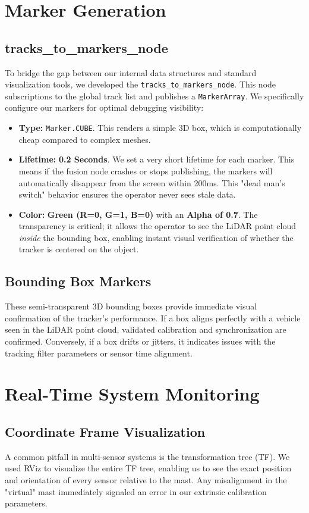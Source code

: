 \documentclass[12pt,a4paper]{report}
\begin{document}
{\section{Marker Generation}

\subsection{tracks\_to\_markers\_node}
To bridge the gap between our internal data structures and standard visualization tools, we developed the \texttt{tracks\_to\_markers\_node}. This node subscriptions to the global track list and publishes a \texttt{MarkerArray}. We specifically configure our markers for optimal debugging visibility:
\begin{itemize}
    \item \textbf{Type:} \texttt{Marker.CUBE}. This renders a simple 3D box, which is computationally cheap compared to complex meshes.
    \item \textbf{Lifetime:} \textbf{0.2 Seconds}. We set a very short lifetime for each marker. This means if the fusion node crashes or stops publishing, the markers will automatically disappear from the screen within 200ms. This "dead man's switch" behavior ensures the operator never sees stale data.
    \item \textbf{Color:} \textbf{Green (R=0, G=1, B=0)} with an \textbf{Alpha of 0.7}. The transparency is critical; it allows the operator to see the LiDAR point cloud \textit{inside} the bounding box, enabling instant visual verification of whether the tracker is centered on the object.
\end{itemize}

\subsection{Bounding Box Markers}
These semi-transparent 3D bounding boxes provide immediate visual confirmation of the tracker's performance. If a box aligns perfectly with a vehicle seen in the LiDAR point cloud, validated calibration and synchronization are confirmed. Conversely, if a box drifts or jitters, it indicates issues with the tracking filter parameters or sensor time alignment.

\section{Real-Time System Monitoring}

\subsection{Coordinate Frame Visualization}
A common pitfall in multi-sensor systems is the transformation tree (TF). We used RViz to visualize the entire TF tree, enabling us to see the exact position and orientation of every sensor relative to the mast. Any misalignment in the "virtual" mast immediately signaled an error in our extrinsic calibration parameters.

}
\end{document}
